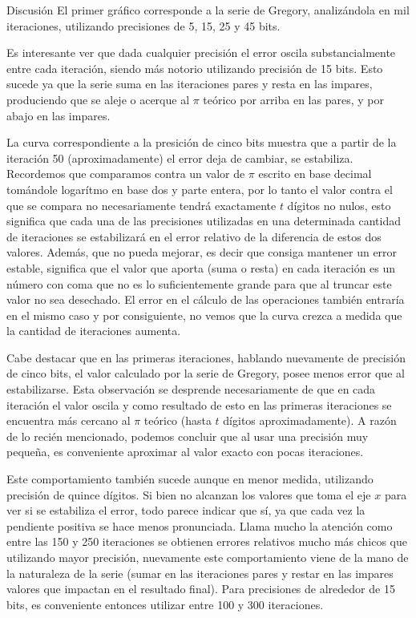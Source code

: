 \begin{section}{Discusión}
	El primer gráfico corresponde a la serie de Gregory, analizándola en mil iteraciones, utilizando precisiones de 5, 15, 25 y 45 bits. 
	
	Es interesante ver que dada cualquier precisión el error oscila substancialmente entre cada iteración, siendo más notorio utilizando precisión de 15 bits. Esto sucede ya que la serie suma en las iteraciones pares y resta en las impares, produciendo que se aleje o acerque al $\pi$ teórico por arriba en las pares, y por abajo en las impares.
	
	La curva correspondiente a la presición de cinco bits muestra que a partir de la iteración 50 (aproximadamente) el error deja de cambiar, se estabiliza. Recordemos que comparamos contra un valor de $\pi$ escrito en base decimal tomándole logarítmo en base dos y parte entera, por lo tanto el valor contra el que se compara no necesariamente tendrá exactamente $t$ dígitos no nulos, esto significa que cada una de las precisiones utilizadas en una determinada cantidad de iteraciones se estabilizará en el error relativo de la diferencia de estos dos valores. Además, que no pueda mejorar, es decir que consiga mantener un error estable, significa que el valor que aporta (suma o resta) en cada iteración es un número con coma que no es lo suficientemente grande para que al truncar este valor no sea desechado. El error en el cálculo de las operaciones también entraría en el mismo caso y por consiguiente, no vemos que la curva crezca a medida que la cantidad de iteraciones aumenta.
	
	Cabe destacar que en las primeras iteraciones, hablando nuevamente de precisión de cinco bits, el valor calculado por la serie de Gregory, posee menos error que al estabilizarse. Esta observación se desprende necesariamente de que en cada iteración el valor oscila y como resultado de esto en las primeras iteraciones se encuentra más cercano al $\pi$ teórico (hasta $t$ dígitos aproximadamente). A razón de lo recién mencionado, podemos concluir que al usar una precisión muy pequeña, es conveniente aproximar al valor exacto con pocas iteraciones.
	
	Este comportamiento también sucede aunque en menor medida, utilizando precisión de quince dígitos. Si bien no alcanzan los valores que toma el eje $x$ para ver si se estabiliza el error, todo parece indicar que sí, ya que cada vez la pendiente positiva se hace menos pronunciada. Llama mucho la atención como entre las 150 y 250 iteraciones se obtienen errores relativos mucho más chicos que utilizando mayor precisión, nuevamente este comportamiento viene de la mano de la naturaleza de la serie (sumar en las iteraciones pares y restar en las impares valores que impactan en el resultado final). Para precisiones de alrededor de 15 bits, es conveniente entonces utilizar entre 100 y 300 iteraciones.


\end{section}
